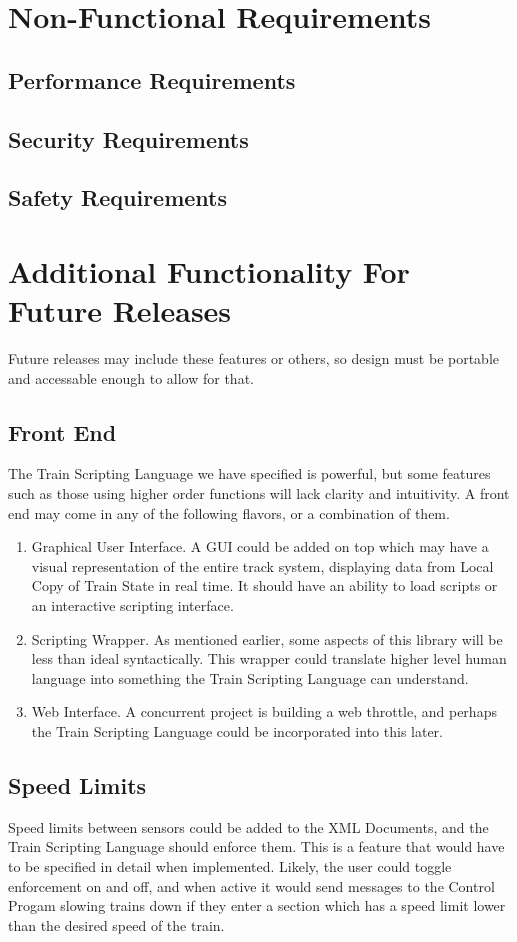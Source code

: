 \documentclass[a4paper,11pt,notitlepage]{article}
\def\TSL{Train Scripting Language\xspace}
\def\CS{Control Progam\xspace}
\def\LC{Local Copy of Train State\xspace}
\begin{document}
\newpage
\section{Non-Functional Requirements}
\subsection{Performance Requirements}
\subsection{Security Requirements}
\subsection{Safety Requirements}

\newpage
\section{Additional Functionality For Future Releases}
Future releases may include these features or others, so design must be portable and accessable enough to allow for that.
\subsection{Front End}
The \TSL we have specified is powerful, but some features such as those using higher order functions will lack clarity and intuitivity. A front end may come in any of the following flavors, or a combination of them.
\begin{enumerate}
	\item Graphical User Interface. A GUI could be added on top which may have a visual representation of the entire track system, displaying data from \LC in real time. It should have an ability to load scripts or an interactive scripting interface.
	\item Scripting Wrapper. As mentioned earlier, some aspects of this library will be less than ideal syntactically. This wrapper could translate higher level human language into something the \TSL can understand.
	\item Web Interface. A concurrent project is building a web throttle, and perhaps the \TSL could be incorporated into this later.
\end{enumerate}
\subsection{Speed Limits}
Speed limits between sensors could be added to the XML Documents, and the \TSL should enforce them. This is a feature that would have to be specified in detail when implemented. Likely, the user could toggle enforcement on and off, and when active it would send messages to the \CS slowing trains down if they enter a section which has a speed limit lower than the desired speed of the train.
\end{document}
